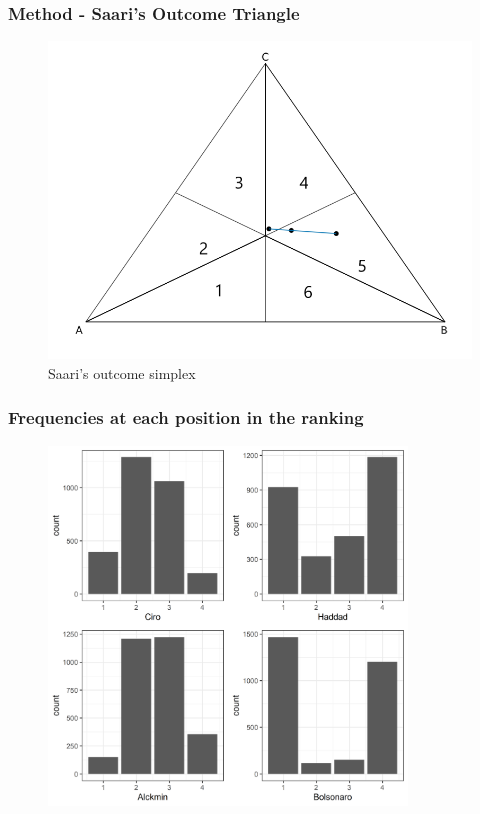 \documentclass[xcolor={svgnames}]{beamer}
\begin{document}
\begin{frame}
  \frametitle{Method - Saari's Outcome Triangle}
\begin{figure}[H] \centering \includegraphics[width=\textwidth]{../images/simpletriangle.png}
 \caption{Saari's outcome simplex}
 \label{fig:saari_nurmi}
\end{figure}
\end{frame}


\begin{frame}
  \frametitle{Frequencies at each position in the ranking}
\begin{figure}[!h] \centering

\includegraphics[width=0.85\textwidth, height = 0.85\textheight]{../images/corrected1_indexes_plot.png}



\end{figure}
\end{frame}
\end{document}
